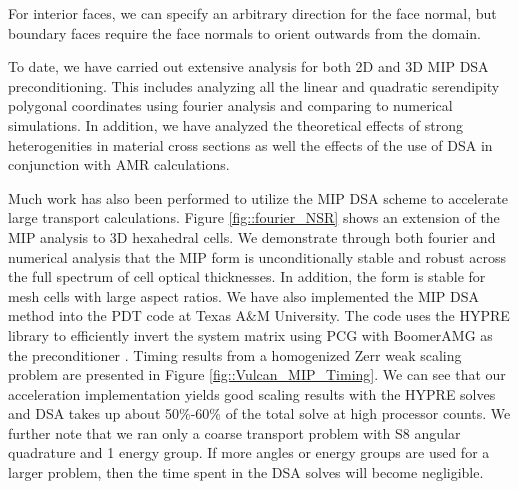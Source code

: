 \documentclass[11pt]{article}
\begin{document}
\noindent For interior faces, we can specify an arbitrary direction for the face normal, but boundary faces require the face normals to orient outwards from the domain.

To date, we have carried out extensive analysis for both 2D and 3D MIP DSA preconditioning. This includes analyzing all the linear and quadratic serendipity polygonal coordinates using fourier analysis and comparing to numerical simulations. In addition, we have analyzed the theoretical effects of strong heterogenities in material cross sections as well the effects of the use of DSA in conjunction with AMR calculations. 

Much work has also been performed to utilize the MIP DSA scheme to accelerate large transport calculations. Figure \ref{fig::fourier_NSR} shows an extension of the MIP analysis to 3D hexahedral cells. We demonstrate through both fourier and numerical analysis that the MIP form is unconditionally stable and robust across the full spectrum of cell optical thicknesses. In addition, the form is stable for mesh cells with large aspect ratios. We have also implemented the MIP DSA method into the PDT code at Texas A\&M University. The code uses the HYPRE library to efficiently invert the system matrix using PCG with BoomerAMG as the preconditioner \cite{ref::hypre,yang2002boomeramg}. Timing results from a homogenized Zerr weak scaling problem are presented in Figure \ref{fig::Vulcan_MIP_Timing}. We can see that our acceleration implementation yields good scaling results with the HYPRE solves and DSA takes up about 50\%-60\% of the total solve at high processor counts. We further note that we ran only a coarse transport problem with S8 angular quadrature and 1 energy group. If more angles or energy groups are used for a larger problem, then the time spent in the DSA solves will become negligible.
\end{document}
